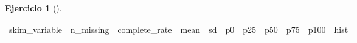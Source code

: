 \documentclass[
  a4paper,
]{scrreport}
\theoremstyle{definition}
\newtheorem{exercise}{Ejercicio}[chapter]
\theoremstyle{remark}
\begin{document}
\begin{exercise}[]
\begin{enumerate}
\begin{tcolorbox}
  \begin{longtable}[]{@{}
    >{\raggedright\arraybackslash}p{}
    >{\raggedleft\arraybackslash}p{}
    >{\raggedleft\arraybackslash}p{}
    >{\raggedleft\arraybackslash}p{}
    >{\raggedleft\arraybackslash}p{}
    >{\raggedleft\arraybackslash}p{}
    >{\raggedleft\arraybackslash}p{}
    >{\raggedleft\arraybackslash}p{}
    >{\raggedleft\arraybackslash}p{}
    >{\raggedleft\arraybackslash}p{}
    >{\raggedright\arraybackslash}p{}@{}}
  \toprule\noalign{}
  \begin{minipage}[b]{\linewidth}\raggedright
  skim\_variable
  \end{minipage} & \begin{minipage}[b]{\linewidth}\raggedleft
  n\_missing
  \end{minipage} & \begin{minipage}[b]{\linewidth}\raggedleft
  complete\_rate
  \end{minipage} & \begin{minipage}[b]{\linewidth}\raggedleft
  mean
  \end{minipage} & \begin{minipage}[b]{\linewidth}\raggedleft
  sd
  \end{minipage} & \begin{minipage}[b]{\linewidth}\raggedleft
  p0
  \end{minipage} & \begin{minipage}[b]{\linewidth}\raggedleft
  p25
  \end{minipage} & \begin{minipage}[b]{\linewidth}\raggedleft
  p50
  \end{minipage} & \begin{minipage}[b]{\linewidth}\raggedleft
  p75
  \end{minipage} & \begin{minipage}[b]{\linewidth}\raggedleft
  p100
  \end{minipage} & \begin{minipage}[b]{\linewidth}\raggedright
  hist
  \end{minipage} \\

\end{longtable}
\end{tcolorbox}
\end{enumerate}
\end{exercise}
\end{document}

